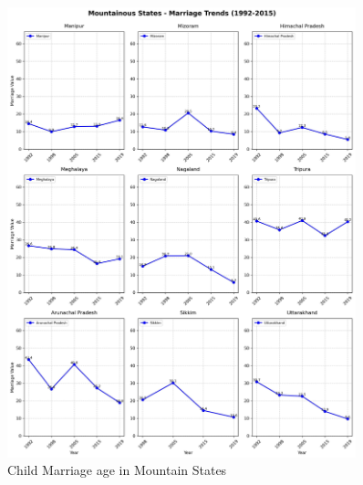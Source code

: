 \begin{figure}[H]
    \centering
    \includegraphics[width=0.9\textwidth]{figures/nfhs/mountainous_states_marriage_subplots.pdf}
    \caption{Child Marriage age in Mountain States}
    \label{fig:nfhs_mountain_marriage}
\end{figure}

